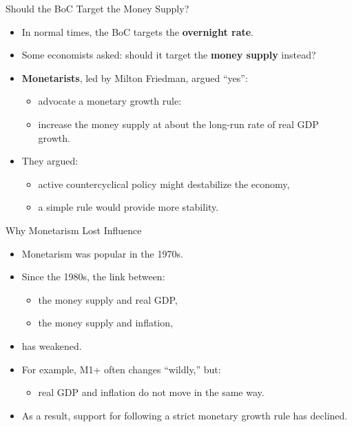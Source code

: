 \documentclass[aspectratio=169]{beamer}
\begin{document}
\begin{frame}{Should the BoC Target the Money Supply?}
\transfade
\begin{itemize}[<+->]
  \item In normal times, the BoC targets the \textbf{overnight rate}.
  \item Some economists asked: should it target the \textbf{money supply} instead?
  \item \textbf{Monetarists}, led by Milton Friedman, argued “yes”:
  \begin{itemize}[<+->]
    \item advocate a \alert{monetary growth rule}:
    \item increase the money supply at about the long-run rate of real GDP growth.
  \end{itemize}
  \item They argued:
  \begin{itemize}[<+->]
    \item active countercyclical policy might destabilize the economy,
    \item a simple rule would provide more stability.
  \end{itemize}
\end{itemize}
\end{frame}

\begin{frame}{Why Monetarism Lost Influence}
\transfade
\begin{itemize}[<+->]
  \item Monetarism was popular in the 1970s.
  \item Since the 1980s, the link between:
  \begin{itemize}[<+->]
    \item the money supply and real GDP,
    \item the money supply and inflation,
  \end{itemize}
  \item has weakened.
  \item For example, M1+ often changes “wildly,” but:
  \begin{itemize}[<+->]
    \item real GDP and inflation do not move in the same way.
  \end{itemize}
  \item As a result, support for following a strict monetary growth rule has declined.
\end{itemize}
\end{frame}
\end{document}
